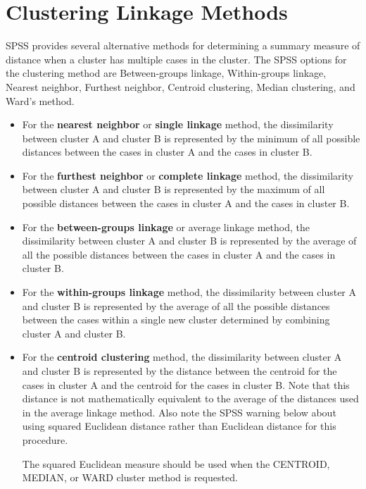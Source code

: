 \documentclass[a4paper,12pt]{article}
\begin{document}
\section{Clustering Linkage Methods}

SPSS provides several alternative methods for determining a summary measure of distance when a cluster has multiple cases in the cluster.  The SPSS options for the clustering method are Between-groups linkage, Within-groups linkage, Nearest neighbor, Furthest neighbor, Centroid clustering, Median clustering, and Ward's method.

\begin{itemize}
	\item For the \textbf{nearest neighbor} or \textbf{single linkage} method, the dissimilarity between cluster A and cluster B is represented by the minimum of all possible distances between the cases in cluster A and the cases in cluster B.
	
	\item For the \textbf{furthest neighbor} or \textbf{complete linkage} method, the dissimilarity between cluster A and cluster B is represented by the maximum of all possible distances between the cases in cluster A and the cases in cluster B.
	
	\item For the \textbf{between-groups linkage} or average linkage method, the dissimilarity between cluster A and cluster B is represented by the average of all the possible distances between the cases in cluster A and the cases in cluster B.
	
	\item For the \textbf{within-groups linkage} method, the dissimilarity between cluster A and cluster B is represented by the average of all the possible distances between the cases within a single new cluster determined by combining cluster A and cluster B.
	
	\item  
	For the \textbf{centroid clustering} method, the dissimilarity between cluster A and cluster B is represented by the distance between the centroid for the cases in cluster A and the centroid for the cases in cluster B.  Note that this distance is not mathematically equivalent to the average of the distances used in the average linkage method.  Also note the SPSS warning below about using squared Euclidean distance rather than Euclidean distance for this procedure.
	
	\begin{framed}
		The squared Euclidean measure should be used when the CENTROID, MEDIAN, or WARD cluster method is requested.
	\end{framed}
	

\end{itemize}
\end{document}
